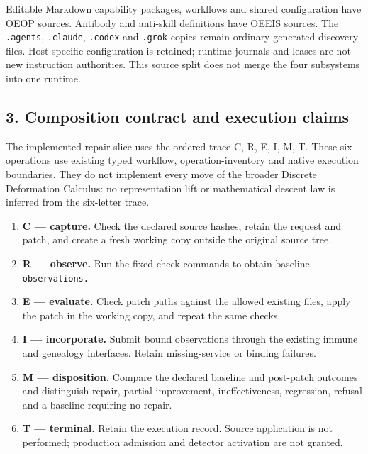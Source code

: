 \documentclass[
  11pt,
]{article}
\newcommand{\passthrough}[1]{#1}
\providecommand{\tightlist}{%
  \setlength{\itemsep}{0pt}\setlength{\parskip}{0pt}}
\begin{document}
Editable Markdown capability packages, workflows and shared
configuration have OEOP sources. Antibody and anti-skill definitions
have OEEIS sources. The \passthrough{\lstinline!.agents!},
\passthrough{\lstinline!.claude!}, \passthrough{\lstinline!.codex!} and
\passthrough{\lstinline!.grok!} copies remain ordinary generated
discovery files. Host-specific configuration is retained; runtime
journals and leases are not new instruction authorities. This source
split does not merge the four subsystems into one runtime.

\subsection{3. Composition contract and execution
claims}\label{composition-contract-and-execution-claims}

The implemented repair slice uses the ordered trace C, R, E, I, M, T.
These six operations use existing typed workflow, operation-inventory
and native execution boundaries. They do not implement every move of the
broader Discrete Deformation Calculus: no representation lift or
mathematical descent law is inferred from the six-letter trace.

\begin{enumerate}
\def\labelenumi{\arabic{enumi}.}
\tightlist
\item
  \textbf{C --- capture.} Check the declared source hashes, retain the
  request and patch, and create a fresh working copy outside the
  original source tree.
\item
  \textbf{R --- observe.} Run the fixed check commands to obtain
  baseline \nolinkurl{observations.}
\item
  \textbf{E --- evaluate.} Check patch paths against the allowed
  existing files, apply the patch in the working copy, and repeat the
  same checks.
\item
  \textbf{I --- incorporate.} Submit bound observations through the
  existing immune and genealogy interfaces. Retain missing-service or
  binding failures.
\item
  \textbf{M --- disposition.} Compare the declared baseline and
  post-patch outcomes and distinguish repair, partial improvement,
  ineffectiveness, regression, refusal and a baseline requiring no
  repair.
\item
  \textbf{T --- terminal.} Retain the execution record. Source
  application is not performed; production admission and detector
  activation are not granted.
\end{enumerate}
\end{document}
